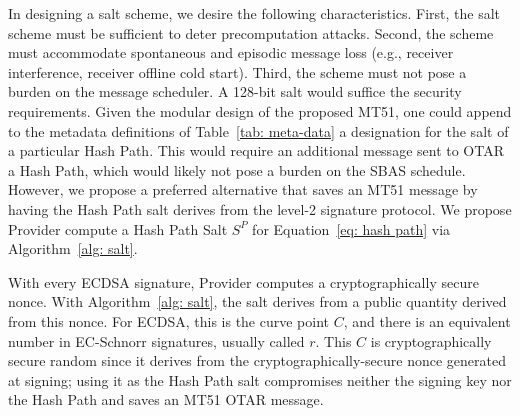\documentclass[APA,STIX1COL]{IONjournal/ION-APA Template}
\begin{document}
			In designing a salt scheme, we desire the following characteristics.
			First, the salt scheme must be sufficient to deter precomputation attacks.
			Second, the scheme must accommodate spontaneous and episodic message loss (e.g., receiver interference, receiver offline cold start).
			Third, the scheme must not pose a burden on the message scheduler.
			A 128-bit salt would suffice the security requirements.
			Given the modular design of the proposed MT51, one could append to the metadata definitions of Table~\ref{tab: meta-data} a designation for the salt of a particular Hash Path.
			This would require an additional message sent to OTAR a Hash Path, which would likely not pose a burden on the SBAS schedule.
			However, we propose a preferred alternative that saves an MT51 message by having the Hash Path salt derives from the level-2 signature protocol.
			We propose Provider compute a Hash Path Salt $S^P$ for Equation~\eqref{eq: hash path} via Algorithm~\ref{alg: salt}.


			With every ECDSA signature, Provider computes a cryptographically secure nonce.
			With Algorithm~\ref{alg: salt}, the salt derives from a public quantity derived from this nonce.
			For ECDSA, this is the curve point $C$, and there is an equivalent number in EC-Schnorr signatures, usually called $r$.
			This $C$ is cryptographically secure random since it derives from the cryptographically-secure nonce generated at signing; using it as the Hash Path salt compromises neither the signing key nor the Hash Path and saves an MT51 OTAR message.
\end{document}
